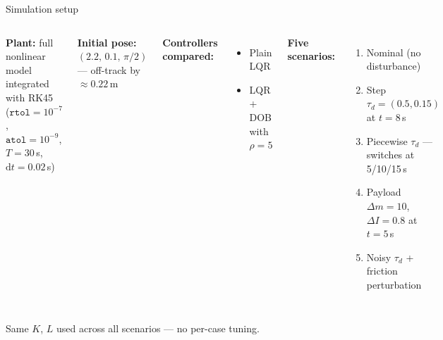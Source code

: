 \documentclass[10pt,aspectratio=169]{beamer}
\begin{document}
\begin{frame}{Simulation setup}
  \begin{columns}[T]
      \textbf{Plant:} full nonlinear model integrated with RK45\\
      ($\mathtt{rtol}{=}10^{-7}$, $\mathtt{atol}{=}10^{-9}$,\\
       $T{=}30$\,s, $\mathrm{d}t{=}0.02$\,s)

      \vspace{0.6em}
      \textbf{Initial pose:} $(2.2,\,0.1,\,\pi/2)$ — off-track
      by $\approx 0.22$\,m

      \vspace{0.6em}
      \textbf{Controllers compared:}
      \begin{itemize}
        \item Plain LQR
        \item LQR + DOB with $\rho=5$
      \end{itemize}

      \textbf{Five scenarios:}
      \begin{enumerate}\setlength\itemsep{2pt}
        \item[(S1)] Nominal (no disturbance)
        \item[(S2)] Step $\tau_d{=}(0.5,0.15)$ at $t{=}8$\,s
        \item[(S3)] Piecewise $\tau_d$ — switches at 5/10/15\,s
        \item[(S4)] Payload $\Delta m{=}10$, $\Delta I{=}0.8$ at $t{=}5$\,s
        \item[(S5)] Noisy $\tau_d$ + friction perturbation
      \end{enumerate}
  \end{columns}

  \vspace{0.6em}
  \centering
  \alert{Same $K$, $L$ used across all scenarios — no per-case tuning.}
\end{frame}
\end{document}
